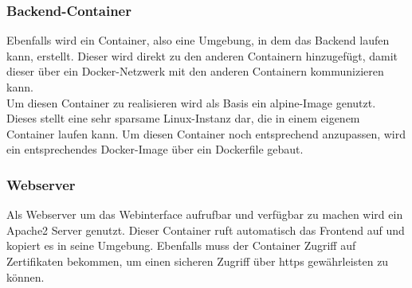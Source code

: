 		\subsubsection{Backend-Container}
		
		Ebenfalls wird ein Container, also eine Umgebung, in dem das Backend laufen kann, erstellt. Dieser wird direkt zu den anderen Containern hinzugefügt, damit dieser über ein Docker-Netzwerk mit den anderen Containern kommunizieren kann.~\\
		Um diesen Container zu realisieren wird als Basis ein alpine-Image genutzt. Dieses stellt eine sehr sparsame Linux-Instanz dar, die in einem eigenem Container laufen kann. Um diesen Container noch entsprechend anzupassen, wird ein entsprechendes Docker-Image über ein Dockerfile gebaut.\cite{alpine}
		
		\subsubsection{Webserver}
		
		Als Webserver um das Webinterface aufrufbar und verfügbar zu machen wird ein Apache2 Server genutzt. Dieser Container ruft automatisch das Frontend auf und kopiert es in seine Umgebung. Ebenfalls muss der Container Zugriff auf Zertifikaten bekommen, um einen sicheren Zugriff über \gls{https} gewährleisten zu können.\cite{apache}
				
